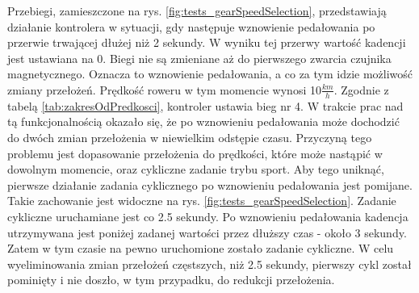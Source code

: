 Przebiegi, zamieszczone na rys. \ref{fig:tests_gearSpeedSelection}, przedstawiają działanie kontrolera w sytuacji, gdy następuje wznowienie pedałowania po przerwie trwającej dłużej niż 2 sekundy. W wyniku tej przerwy wartość kadencji jest ustawiana na 0. Biegi nie są zmieniane aż do pierwszego zwarcia czujnika magnetycznego. Oznacza to wznowienie pedałowania, a co za tym idzie możliwość zmiany przełożeń. Prędkość roweru w tym momencie wynosi 10$\frac{km}{h}$. Zgodnie z tabelą \ref{tab:zakresOdPredkosci}, kontroler ustawia bieg nr 4. W trakcie prac nad tą funkcjonalnością okazało się, że po wznowieniu pedałowania może dochodzić do dwóch zmian przełożenia w niewielkim odstępie czasu. Przyczyną tego problemu jest dopasowanie przełożenia do prędkości, które może nastąpić w dowolnym momencie, oraz cykliczne zadanie trybu sport. Aby tego uniknąć, pierwsze działanie zadania cyklicznego po wznowieniu pedałowania jest pomijane. Takie zachowanie jest widoczne na rys. \ref{fig:tests_gearSpeedSelection}. Zadanie cykliczne uruchamiane jest co 2.5 sekundy. Po wznowieniu pedałowania kadencja utrzymywana jest poniżej zadanej wartości przez dłuższy czas - około 3 sekundy. Zatem w tym czasie na pewno uruchomione zostało zadanie cykliczne. W celu wyeliminowania zmian przełożeń częstszych, niż 2.5 sekundy, pierwszy cykl został pominięty i nie doszło, w tym przypadku, do redukcji przełożenia.







